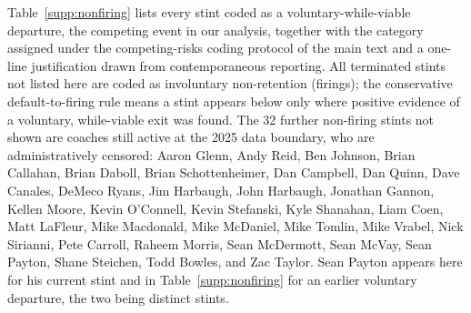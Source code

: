 \documentclass[12pt,USenglish]{article}
\begin{document}
Table~\ref{supp:nonfiring} lists every stint coded as a voluntary-while-viable departure, the competing event in our analysis, together with the category assigned under the competing-risks coding protocol of the main text and a one-line justification drawn from contemporaneous reporting. All terminated stints not listed here are coded as involuntary non-retention (firings); the conservative default-to-firing rule means a stint appears below only where positive evidence of a voluntary, while-viable exit was found. The 32 further non-firing stints not shown are coaches still active at the 2025 data boundary, who are administratively censored: Aaron Glenn, Andy Reid, Ben Johnson, Brian Callahan, Brian Daboll, Brian Schottenheimer, Dan Campbell, Dan Quinn, Dave Canales, DeMeco Ryans, Jim Harbaugh, John Harbaugh, Jonathan Gannon, Kellen Moore, Kevin O'Connell, Kevin Stefanski, Kyle Shanahan, Liam Coen, Matt LaFleur, Mike Macdonald, Mike McDaniel, Mike Tomlin, Mike Vrabel, Nick Sirianni, Pete Carroll, Raheem Morris, Sean McDermott, Sean McVay, Sean Payton, Shane Steichen, Todd Bowles, and Zac Taylor. Sean Payton appears here for his current stint and in Table~\ref{supp:nonfiring} for an earlier voluntary departure, the two being distinct stints.
\end{document}
